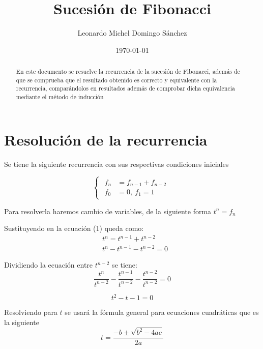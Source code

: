 \documentclass[letterpaper,11pt]{article}
\title{Sucesión de Fibonacci}
\author{Leonardo Michel Domingo Sánchez}
\date{\today}
\begin{document}
\maketitle
\tableofcontents

\begin{abstract}
	En este documento se resuelve la recurrencia de la sucesión de Fibonacci, además de que se comprueba que el resultado obtenido es correcto y equivalente con la recurrencia, comparándolos en resultados además de comprobar dicha equivalencia mediante el método de inducción
\end{abstract}

\section{Resolución de la recurrencia}
Se tiene la siguiente recurrencia con sus respectivas condiciones iniciales

\begin{equation}
\begin{cases}
\begin{aligned}
	f_{n} &= f_{n-1} + f_{n-2} \\
	f_{0} &= 0, \ f_{1} = 1
\end{aligned}
\end{cases}
\end{equation}

Para resolverla haremos cambio de variables, de la siguiente forma
$t^{n} = f_{n}$

Sustituyendo en la ecuación (1) queda como:
\begin{equation*}
	\begin{aligned}
		&t^{n} = t^{n-1} + t^{n-2} \\
		&t^{n} - t^{n-1} - t^{n-2} = 0
	\end{aligned}
\end{equation*}

Dividiendo la ecuación entre $t^{n-2}$ se tiene:
\begin{equation*}
	\frac{t^{n}}{t^{n-2}} - \frac{t^{n-1}}{t^{n-2}} - \frac{t^{n-2}}{t^{n-2}} = 0
\end{equation*}

\begin{equation}
	t^{2} - t - 1 = 0
\end{equation}

Resolviendo para $t$ se usará la fórmula general para ecuaciones cuadráticas que es la siguiente \[t = \frac{-b \pm \sqrt{b^2 - 4ac}}{2a}\] \newpage
\end{document}
